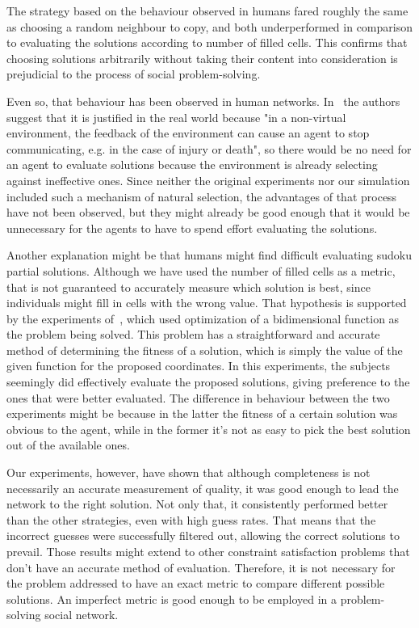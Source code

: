 \documentclass{article}
\begin{document}
The strategy based on the behaviour observed in humans fared roughly the same as choosing a random neighbour to copy, and both underperformed in comparison to evaluating the solutions according to number of filled cells. This confirms that choosing solutions arbitrarily without taking their content into consideration is prejudicial to the process of social problem-solving.

Even so, that behaviour has been observed in human networks. In~\cite{farenzena:collabem} the authors suggest that it is justified in the real world because "in a non-virtual environment, the feedback of the environment can cause an agent to stop communicating, e.g. in the case of injury or death", so there would be no need for an agent to evaluate solutions because the environment is already selecting against ineffective ones. Since neither the original experiments nor our simulation included such a mechanism of natural selection, the advantages of that process have not been observed, but they might already be good enough that it would be unnecessary for the agents to have to spend effort evaluating the solutions.

Another explanation might be that humans might find difficult evaluating sudoku partial solutions. Although we have used the number of filled cells as a metric, that is not guaranteed to accurately measure which solution is best, since individuals might fill in cells with the wrong value. That hypothesis is supported by the experiments of~\cite{mason:collablearnet}, which used optimization of a bidimensional function as the problem being solved. This problem has a straightforward and accurate method of determining the fitness of a solution, which is simply the value of the given function for the proposed coordinates. In this experiments, the subjects seemingly did effectively evaluate the proposed solutions, giving preference to the ones that were better evaluated. The difference in behaviour between the two experiments might be because in the latter the fitness of a certain solution was obvious to the agent, while in the former it's not as easy to pick the best solution out of the available ones.

Our experiments, however, have shown that although completeness is not necessarily an accurate measurement of quality, it was good enough to lead the network to the right solution. Not only that, it consistently performed better than the other strategies, even with high guess rates. That means that the incorrect guesses were successfully filtered out, allowing the correct solutions to prevail. Those results might extend to other constraint satisfaction problems that don't have an accurate method of evaluation. Therefore, it is not necessary for the problem addressed to have an exact metric to compare different possible solutions. An imperfect metric is good enough to be employed in a problem-solving social network. 
\end{document}
